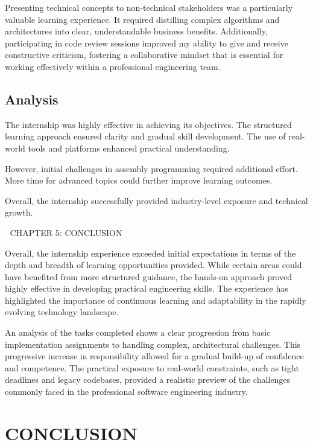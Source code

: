 \documentclass[12pt,a4paper]{report}
\begin{document}
Presenting technical concepts to non-technical stakeholders was a particularly valuable learning experience. It required distilling complex algorithms and architectures into clear, understandable business benefits. Additionally, participating in code review sessions improved my ability to give and receive constructive criticism, fostering a collaborative mindset that is essential for working effectively within a professional engineering team.


\section{Analysis}

The internship was highly effective in achieving its objectives. The structured learning approach ensured clarity and gradual skill development. The use of real-world tools and platforms enhanced practical understanding.


However, initial challenges in assembly programming required additional effort. More time for advanced topics could further improve learning outcomes.


Overall, the internship successfully provided industry-level exposure and technical growth.


🔷 CHAPTER 5: CONCLUSION


Overall, the internship experience exceeded initial expectations in terms of the depth and breadth of learning opportunities provided. While certain areas could have benefited from more structured guidance, the hands-on approach proved highly effective in developing practical engineering skills. The experience has highlighted the importance of continuous learning and adaptability in the rapidly evolving technology landscape.


An analysis of the tasks completed shows a clear progression from basic implementation assignments to handling complex, architectural challenges. This progressive increase in responsibility allowed for a gradual build-up of confidence and competence. The practical exposure to real-world constraints, such as tight deadlines and legacy codebases, provided a realistic preview of the challenges commonly faced in the professional software engineering industry.




\chapter{CONCLUSION}
\label{ch:conclusion}
\end{document}
